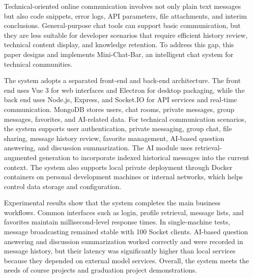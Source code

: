 \documentclass[twoside]{thesis-cls-Miya}
\begin{document}
\begin{englishabstract}
Technical-oriented online communication involves not only plain text messages but also code snippets, error logs, API parameters, file attachments, and interim conclusions. General-purpose chat tools can support basic communication, but they are less suitable for developer scenarios that require efficient history review, technical content display, and knowledge retention. To address this gap, this paper designs and implements Mini-Chat-Bar, an intelligent chat system for technical communities.

The system adopts a separated front-end and back-end architecture. The front end uses Vue 3 for web interfaces and Electron for desktop packaging, while the back end uses Node.js, Express, and Socket.IO for API services and real-time communication. MongoDB stores users, chat rooms, private messages, group messages, favorites, and AI-related data. For technical communication scenarios, the system supports user authentication, private messaging, group chat, file sharing, message history review, favorite management, AI-based question answering, and discussion summarization. The AI module uses retrieval-augmented generation to incorporate indexed historical messages into the current context. The system also supports local private deployment through Docker containers on personal development machines or internal networks, which helps control data storage and configuration.

Experimental results show that the system completes the main business workflows. Common interfaces such as login, profile retrieval, message lists, and favorites maintain millisecond-level response times. In single-machine tests, message broadcasting remained stable with 100 Socket clients. AI-based question answering and discussion summarization worked correctly and were recorded in message history, but their latency was significantly higher than local services because they depended on external model services. Overall, the system meets the needs of course projects and graduation project demonstrations.

\end{englishabstract}

\tableofcontents

\mainmatter








\end{document}
